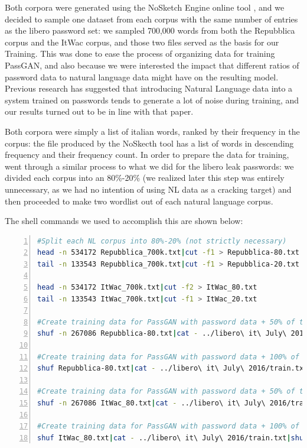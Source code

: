 Both corpora were generated using the NoSketch Engine online tool \cite{nosketch_engine}, and we decided to sample one dataset from each corpus with the same number of entries as the libero password set: we sampled 700,000 words from both the Repubblica corpus and the ItWac corpus, and those two files served as the basis for our Training. This was done to ease the process of organizing data for training PassGAN, and also because we were interested the impact that different ratios of password data to natural language data might have on the resulting model.
Previous research \cite{Melicher2016} has suggested that introducing Natural Language data into a system trained on passwords tends to generate a lot of noise during training, and our results turned out to be in line with that paper.

Both corpora were simply a list of italian words, ranked by their frequency in the corpus: the file produced by the NoSkecth tool has a list of words in descending frequency and their frequency count.
In order to prepare the data for training, went through a similar process to what we did for the libero leak passwords: we divided each corpus into an 80\%-20\% (we realized later this step was entirely unnecessary, as we had no intention of using NL data as a cracking target) and then proceeded to make two wordlist out of each natural language corpus.

The shell commands we used to accomplish this are shown below:

\begin{lstlisting}[language=bash,numbers=left,stepnumber=1,breaklines=true,postbreak=\mbox{\textcolor{red}{$\hookrightarrow$}\space}]
#Split each NL corpus into 80%-20% (not strictly necessary)
head -n 534172 Repubblica_700k.txt|cut -f1 > Repubblica-80.txt
tail -n 133543 Repubblica_700k.txt|cut -f1 > Repubblica-20.txt

head -n 534172 ItWac_700k.txt|cut -f2 > ItWac_80.txt
tail -n 133543 ItWac_700k.txt|cut -f1 > ItWac_20.txt

#Create training data for PassGAN with password data + 50% of the Repubblica corpus
shuf -n 267086 Repubblica-80.txt|cat - ../libero\ it\ July\ 2016/train.txt|shuf > libero+Repubblica-50.txt

#Create training data for PassGAN with password data + 100% of the repubblica corpus
shuf Repubblica-80.txt|cat - ../libero\ it\ July\ 2016/train.txt|shuf > libero+Repubblica.txt

#Create training data for PassGAN with password data + 50% of the ItWaC corpus
shuf -n 267086 ItWac_80.txt|cat - ../libero\ it\ July\ 2016/train.txt|shuf > libero+ItWac-50.txt

#Create training data for PassGAN with password data + 100% of the ItwaC corpus
shuf ItWac_80.txt|cat - ../libero\ it\ July\ 2016/train.txt|shuf > libero+ItWac.txt
\end{lstlisting}

